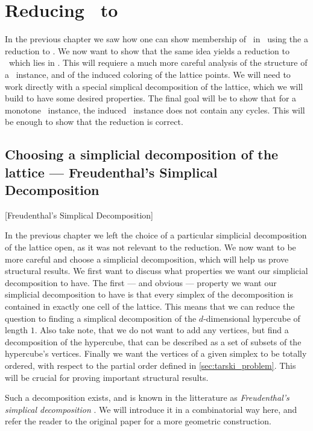 \setchapterpreamble[u]{\margintoc}
\chapter{Reducing \Tarski\ to \EOPL}

In the previous chapter we saw how one can show membership of \Tarski\ in \PPAD\ using the a reduction to \Sperner. We now want to show that the same idea yields a reduction to \EndOfPotentialLine\ which lies in \EOPL. This will requiere a much more careful analysis of the structure of a \Tarski\ instance, and of the induced coloring of the lattice points. We will need to work directly with a special simplical decomposition of the lattice, which we will build to have some desired properties. The final goal will be to show that for a monotone \Tarski\ instance, the induced \EndOfLine\ instance does not contain any cycles. This will be enough to show that the reduction is correct.

\section{Choosing a simplicial decomposition of the lattice --- Freudenthal's Simplical Decomposition}[Freudenthal's Simplical Decomposition]
\label{sec:freudenthal_simplicial_decomposition}

In the previous chapter we left the choice of a particular simplicial decomposition of the lattice open, as it was not relevant to the reduction. We now want to be more careful and choose a simplicial decomposition, which will help us prove structural results. We first want to discuss what properties we want our simplicial decomposition to have. The first --- and obvious --- property we want our simplicial decomposition to have is that every simplex of the decomposition is contained in exactly one cell of the lattice. This means that we can reduce the question to finding a simplical decomposition of the $d$-dimensional hypercube of length $1$. Also take note, that we do not want to add any vertices, but find a decomposition of the hypercube, that can be described as a set of subsets of the hypercube's vertices.	Finally we want the vertices of a given simplex to be totally ordered, with respect to the partial order defined in \cref{sec:tarski_problem}. This will be crucial for proving important structural results.

Such a decomposition exists, and is known in the litterature as \textit{Freudenthal's simplical decomposition} . We will introduce it in a combinatorial way here, and refer the reader to the original paper for a more geometric construction.

